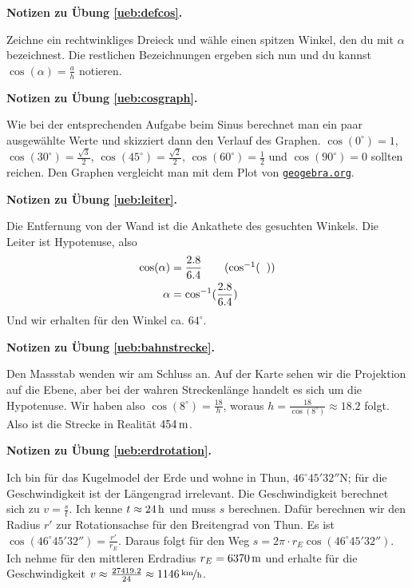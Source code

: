 \documentclass[%
11pt,%
twoside,%
titlepage,%
german,%
headsepline%
]{scrartcl}
\newcommand{\geogebralink}{\href{https://www.geogebra.org/calculator}{\texttt{geogebra.org}}}
\newcommand{\concatueb}[1]{ueb:#1}%
\newcommand{\concatlsg}[1]{lsg:#1}%
\newenvironment{lsg}[1]{%
    \par\noindent\textbf{Notizen zu Übung \ref{\concatueb{#1}}.}%
    \label{\concatlsg{#1}}
}{%
    \par%
}
\begin{document}
\begin{lsg}{defcos}
Zeichne ein rechtwinkliges Dreieck und w\"ahle einen spitzen Winkel, den du mit $\alpha$ bezeichnest. Die restlichen Bezeichnungen ergeben sich nun und du kannst $\cos(\alpha)=\frac{a}{h}$ notieren.
\end{lsg}

\begin{lsg}{cosgraph}
Wie bei der entsprechenden Aufgabe beim Sinus berechnet man ein paar ausgew\"ahlte Werte und skizziert dann den Verlauf des Graphen. $\cos(0^{\circ})=1$, $\cos(30^{\circ})=\frac{\sqrt{3}}{2}$, $\cos(45^{\circ})=\frac{\sqrt{2}}{2}$, $\cos(60^{\circ})=\frac{1}{2}$ und $\cos(90^{\circ})=0$ sollten reichen. Den Graphen vergleicht man mit dem Plot von \geogebralink .
\end{lsg}

\begin{lsg}{leiter}
Die Entfernung von der Wand ist die Ankathete des gesuchten Winkels. Die Leiter ist Hypotenuse, also
\begin{align*}
\cos(\alpha) &= \frac{2.8}{6.4}\tag{$\cos^{-1}(\phantom{x})$}\\
\alpha &= \cos^{-1}(\frac{2.8}{6.4})
\end{align*}
Und wir erhalten f\"ur den Winkel ca. $64^{\circ}$.
\end{lsg}

\begin{lsg}{bahnstrecke}
Den Massstab wenden wir am Schluss an. Auf der Karte sehen wir die Projektion auf die Ebene, aber bei der wahren Streckenl\"ange handelt es sich um die Hypotenuse. Wir haben also $\cos(8^{\circ})=\frac{18}{h}$, woraus $h=\frac{18}{\cos(8^{\circ})}\approx18.2$ folgt. Also ist die Strecke in Realit\"at $\unit[454]{m}$.
\end{lsg}

\begin{lsg}{erdrotation}
Ich bin f\"ur das Kugelmodel der Erde und wohne in Thun, $46^{\circ}45'32''$N; f\"ur die Geschwindigkeit ist der L\"angengrad irrelevant. Die Geschwindigkeit berechnet sich zu $v=\frac{s}{t}$. Ich kenne $t\approx\unit[24]{h}$ und muss $s$ berechnen. Daf\"ur berechnen wir den Radius $r'$ zur Rotationsachse f\"ur den Breitengrad von Thun. Es ist $\cos(46^{\circ}45'32'')=\frac{r'}{r_{E}}$. Daraus folgt f\"ur den Weg $s=2\pi\cdot r_{E}\cos(46^{\circ}45'32'')$. Ich nehme f\"ur den mittleren Erdradius $r_{E}=\unit[6370]{m}$ und erhalte f\"ur die Geschwindigkeit $v\approx\frac{27419.2}{24}\approx\unitfrac[1146]{km}{h}$.
\end{lsg}
\end{document}
